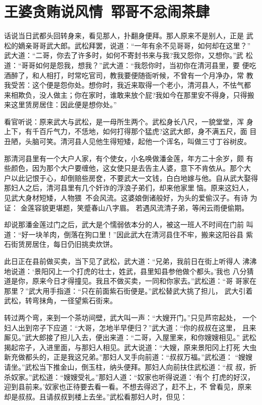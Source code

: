 \chapter{王婆贪贿说风情~郓哥不忿闹茶肆}

话说当日武都头回转身来，看见那人，扑翻身便拜。那人原来不是别人，正是
武松的嫡亲哥哥武大郎。武松拜罢，说道：“一年有余不见哥哥，如何却在这里？”
武大道：“二哥，你去了许多时，如何不寄封书来与我?我又怨你，又想你。”武
松道：“哥哥如何是怨我，想我？”武大道：“我怨你时，当初你在清河县里，要
便吃酒醉了，和人相打，时常吃官司，教我要便随衙听候，不曾有一个月净办，常
教我受苦：这个便是怨你处。想你时，我近来取得一个老小，清河县人，不怯气都
来相欺负，没人做主；你在家时，谁敢来放个屁?我如今在那里安不得身，只得搬
来这里赁房居住：因此便是想你处。”

看官听说：原来武大与武松，是一母所生两个。武松身长八尺，一貌堂堂，浑
身上下，有千百斤气力，不恁地，如何打得那个猛虎?这武大郎，身不满五尺，面
目丑陋，头脑可笑。清河县人见他生得短矮，起他一个诨名，叫做三寸丁谷树皮。

那清河县里有一个大户人家，有个使女，小名唤做潘金莲，年方二十余岁，颇
有些颜色，因为那个大户要缠他，这女使只是去告主人婆，意下不肯依从。那个大
户以此记恨于心，却倒赔些房奁，不要武大一文钱，白白地嫁与他。自从武大娶得
那妇人之后，清河县里有几个奸诈的浮浪子弟们，却来他家里恼。原来这妇人，
见武大身材短矮，人物猥，不会风流。这婆娘倒诸般好，为头的爱偷汉子。有诗
为证：
金莲容貌更堪题，笑蹙春山八字眉。
若遇风流清子弟，等闲云雨便偷期。

却说那潘金莲过门之后，武大是个懦弱依本分的人，被这一班人不时间在门前
叫道：“好一块羊肉，倒落在狗口里！”因此武大在清河县住不牢，搬来这阳谷县
紫石街赁房居住，每日仍旧挑卖炊饼。

此日正在县前做买卖，当下见了武松，武大道：“兄弟，我前日在街上听得人
沸沸地说道：‘景阳冈上一个打虎的壮士，姓武，县里知县参他做个都头。’我也
八分猜道是你，原来今日才得撞见。我且不做买卖，一同和你家去。”武松道：“哥
哥家在那里？”武大用手指道：“只在前面紫石街便是。”武松替武大挑了担儿，
武大引着武松，转弯抹角，一径望紫石街来。

转过两个弯，来到一个茶坊间壁，武大叫一声：“大嫂开门。”只见芦帘起处，
一个妇人出到帘子下应道：“大哥，怎地半早便归？”武大道：“你的叔叔在这里，
且来厮见。”武大郎接了担儿入去，便出来道：“二哥，入屋里来，和你嫂嫂相见。”
武松揭起帘子，入进里面，与那妇人相见。武大说道：“大嫂，原来景阳冈上打死
大虫新充做都头的，正是我这兄弟。”那妇人叉手向前道：“叔叔万福。”武松道：
“嫂嫂请坐。”武松当下推金山，倒玉柱，纳头便拜。那妇人向前扶住武松道：“叔
叔，折杀奴家。”武松道：“嫂嫂受礼。”那妇人道：“奴家也听得说道：‘有个
打虎的好汉，迎到县前来。’奴家也正待要去看一看。不想去得迟了，赶不上，不
曾看见，原来却是叔叔。且请叔叔到楼上去坐。”武松看那妇人时，但见：

